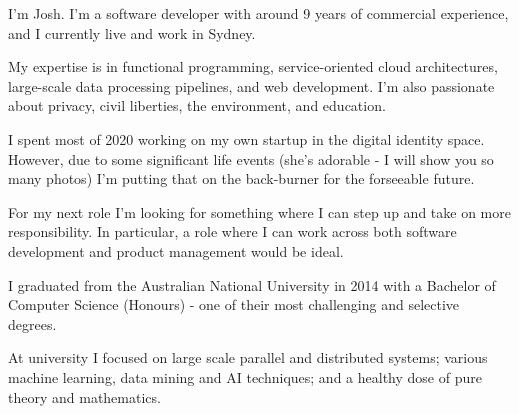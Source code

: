 


\begin{cvletter}
  I'm Josh. I’m a software developer with around 9 years of commercial experience, and I currently live and work in Sydney.

  My expertise is in functional programming, service-oriented cloud architectures, large-scale data processing pipelines, and web development. I'm also passionate about privacy, civil liberties, the environment, and education.

  I spent most of 2020 working on my own startup in the digital identity space. However, due to some significant life events (she's adorable - I will show you so many photos) I'm putting that on the back-burner for the forseeable future.

  For my next role I'm looking for something where I can step up and take on more responsibility. In particular, a role where I can work across both software development and product management would be ideal.

  I graduated from the Australian National University in 2014 with a Bachelor of Computer
  Science (Honours) - one of their most challenging and selective degrees.

  At university I focused on large scale parallel and distributed systems; various machine learning, data mining and AI techniques; and a healthy dose of pure theory and mathematics.

\end{cvletter}